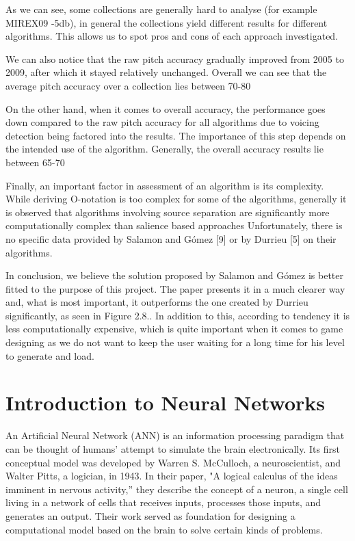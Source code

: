 As we can see, some collections are generally hard to analyse (for example MIREX09 -5db), in general the collections yield different results for different algorithms. This allows us to spot pros and cons of each approach investigated.

We can also notice that the raw pitch accuracy gradually improved from 2005 to 2009, after which it stayed relatively unchanged. Overall we can see that the average pitch accuracy over a collection lies between 70-80%

On the other hand, when it comes to overall accuracy, the performance goes down compared to the raw pitch accuracy for all algorithms due to voicing detection being factored into the results. The importance of this step depends on the intended use of the algorithm. Generally, the overall accuracy results lie between 65-70%

Finally, an important factor in assessment of an algorithm is its complexity. While deriving O-notation is too complex for some of the algorithms, generally it is observed that algorithms involving source separation are significantly more computationally complex than salience based approaches Unfortunately, there is no specific data provided by Salamon and G\'{o}mez [9] or by Durrieu [5] on their algorithms.

In conclusion, we believe the solution proposed by Salamon and G\'{o}mez is better fitted to the purpose of this project. The paper presents it in a much clearer way and, what is most important, it outperforms the one created by Durrieu significantly, as seen in Figure 2.8.. In addition to this, according to tendency it is less computationally expensive, which is quite important when it comes to game designing as we do not want to keep the user waiting for a long time for his level to generate and load.

\vspace{20pt}


\section{Introduction to Neural Networks}
An Artificial Neural Network (ANN) is an information processing paradigm that can be thought of humans' attempt to simulate the brain electronically. Its first conceptual model was developed by Warren S. McCulloch, a neuroscientist, and Walter Pitts, a logician, in 1943. In their paper, "A logical calculus of the ideas imminent in nervous activity,” they describe the concept of a neuron, a single cell living in a network of cells that receives inputs, processes those inputs, and generates an output. Their work served as foundation for designing a computational model based on the brain to solve certain kinds of problems.


